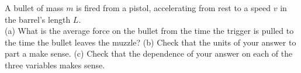 A bullet of mass $m$ is fired from a pistol, accelerating from rest to a
speed $v$ in the barrel's length $L$.\\
%
(a) What is the average
force on the bullet from the time the trigger is pulled to the time
the bullet leaves the muzzle?\answercheck\hwendpart
%
(b) Check that the units of your answer to part a make sense.\hwendpart
%
(c) Check that the dependence of your answer on each of the three variables
makes sense.
